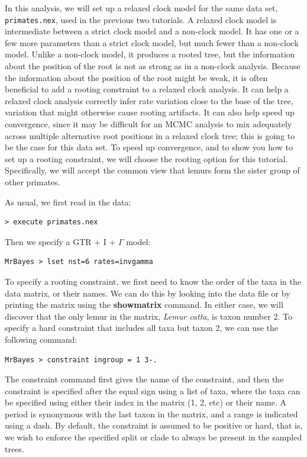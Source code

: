 \documentclass[12pt]{book}
\begin{document}
In this analysis, we will set up a relaxed clock model for the same data set, \texttt{primates.nex}, used in the previous
two tutorials. A relaxed clock model is intermediate between a strict clock model and a non-clock model. It has one or
a few more parameters than a strict clock model, but much fewer than a non-clock model. Unlike a non-clock model,
it produces a rooted tree, but the information about the position of the root is not as strong as in a non-clock analysis.
Because the information about the position of the root might be weak, it is often beneficial to add a rooting constraint
to a relaxed clock analysis. It can help a relaxed clock analysis correctly infer rate variation close to the base of the tree,
variation that might otherwise cause rooting artifacts. It can also help speed up convergence, since it may be difficult for an
MCMC analysis to mix adequately across multiple alternative root positions in a relaxed clock tree; this is going to be
the case for this data set. To speed up convergence, and to show you how to set up a rooting constraint, we will choose
the rooting option for this tutorial. Specifically, we will accept the common view that lemurs form
the sister group of other primates.

As usual, we first read in the data:

\begin{verbatim}
> execute primates.nex
\end{verbatim}

Then we specify a GTR + I + $\Gamma$ model:

\begin{verbatim}
MrBayes > lset nst=6 rates=invgamma
\end{verbatim}

To specify a rooting constraint, we first need to know the order of the taxa in the data matrix, or their names. We
can do this by looking into the data file or by printing the matrix using the \textbf{showmatrix} command. In either
case, we will discover that the only lemur in the matrix, \textit{Lemur catta}, is taxon number 2. To specify a
hard constraint that includes all taxa but taxon 2, we can use the following command:

\begin{verbatim}
MrBayes > constraint ingroup = 1 3-.
\end{verbatim}

The constraint command first gives the name of the constraint, and then the constraint is specified after the
equal sign using a list of taxa, where the taxa can be specified using either their index in the matrix (1, 2, etc) or
their name. A period is synonymous with the last taxon in the matrix, and a range is indicated using a dash. By
default, the constraint is assumed to be positive or hard, that is, we wish to enforce the specified split or clade to
always be present in the sampled trees.
\end{document}
